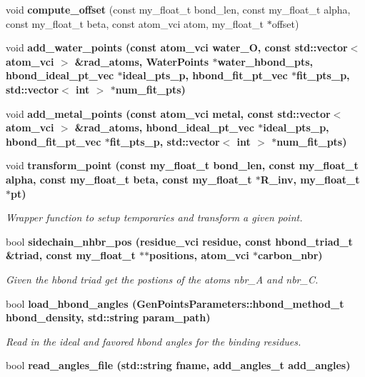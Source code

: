 \begin{CompactItemize}
\item 
void \textbf{compute\_\-offset} (const my\_\-float\_\-t bond\_\-len, const my\_\-float\_\-t alpha, const my\_\-float\_\-t beta, const atom\_\-vci atom, my\_\-float\_\-t $\ast$offset)\label{classSimSite3D_1_1HbondPoints_e49c038430c23fd41cec0f86a7f8d3a0}

\item 
void \bf{add\_\-water\_\-points} (const atom\_\-vci water\_\-O, const std::vector$<$ atom\_\-vci $>$ \&rad\_\-atoms, \bf{Water\-Points} $\ast$water\_\-hbond\_\-pts, \bf{hbond\_\-ideal\_\-pt\_\-vec} $\ast$ideal\_\-pts\_\-p, \bf{hbond\_\-fit\_\-pt\_\-vec} $\ast$fit\_\-pts\_\-p, std::vector$<$ int $>$ $\ast$num\_\-fit\_\-pts)
\item 
void \bf{add\_\-metal\_\-points} (const atom\_\-vci metal, const std::vector$<$ atom\_\-vci $>$ \&rad\_\-atoms, \bf{hbond\_\-ideal\_\-pt\_\-vec} $\ast$ideal\_\-pts\_\-p, \bf{hbond\_\-fit\_\-pt\_\-vec} $\ast$fit\_\-pts\_\-p, std::vector$<$ int $>$ $\ast$num\_\-fit\_\-pts)
\item 
void \bf{transform\_\-point} (const my\_\-float\_\-t bond\_\-len, const my\_\-float\_\-t alpha, const my\_\-float\_\-t beta, const my\_\-float\_\-t $\ast$R\_\-inv, my\_\-float\_\-t $\ast$pt)
\begin{CompactList}\small\item\em Wrapper function to setup temporaries and transform a given point. \item\end{CompactList}\item 
bool \bf{sidechain\_\-nhbr\_\-pos} (residue\_\-vci residue, const \bf{hbond\_\-triad\_\-t} \&triad, const my\_\-float\_\-t $\ast$$\ast$positions, atom\_\-vci $\ast$carbon\_\-nbr)
\begin{CompactList}\small\item\em Given the hbond triad get the postions of the atoms nbr\_\-A and nbr\_\-C. \item\end{CompactList}\item 
bool \bf{load\_\-hbond\_\-angles} (\bf{Gen\-Points\-Parameters::hbond\_\-method\_\-t} hbond\_\-density, std::string param\_\-path)
\begin{CompactList}\small\item\em Read in the ideal and favored hbond angles for the binding residues. \item\end{CompactList}\item 
bool \bf{read\_\-angles\_\-file} (std::string fname, add\_\-angles\_\-t add\_\-angles)
$$
\end{CompactItemize}
